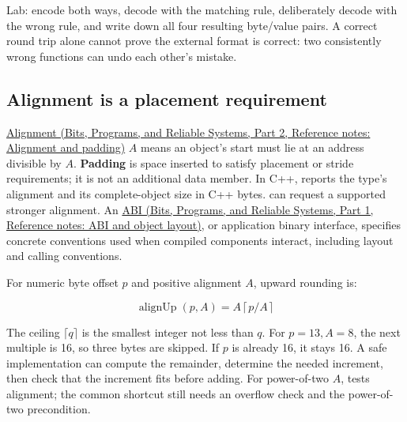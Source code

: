 Lab: encode  both ways, decode with the matching rule, deliberately decode with the wrong rule, and write down all four resulting byte/value pairs. A correct round trip alone cannot prove the external format is correct: two consistently wrong functions can undo each other's mistake.

\subsection{Alignment is a placement requirement}\label{05-engine-i-ch002-alignment-is-a-placement-requirement}

\hypertarget{05-engine-i-ch002-alignment-is-a-placement-requirement}{}

\href{../01-Bits-Programs-and-Reliable-Systems-P02/main.pdf\#nameddest=appendix-a1f7c53b4742}{Alignment (Bits, Programs, and Reliable Systems, Part 2, Reference notes: Alignment and padding)} \(A\) means an object's start must lie at an address divisible by \(A\). \textbf{Padding} is space inserted to satisfy placement or stride requirements; it is not an additional data member. In C++,  reports the type's alignment and  its complete-object size in C++ bytes.  can request a supported stronger alignment. An \href{../01-Bits-Programs-and-Reliable-Systems-P01/main.pdf\#nameddest=appendix-c4ac6bb0fff8}{ABI (Bits, Programs, and Reliable Systems, Part 1, Reference notes: ABI and object layout)}, or application binary interface, specifies concrete conventions used when compiled components interact, including layout and calling conventions.

For numeric byte offset \(p\) and positive alignment \(A\), upward rounding is:

\[
\operatorname{alignUp}(p,A)=A\left\lceil p/A\right\rceil
\]

The ceiling \(\lceil q\rceil\) is the smallest integer not less than \(q\). For \(p=13,A=8\), the next multiple is 16, so three bytes are skipped. If \(p\) is already 16, it stays 16. A safe implementation can compute the remainder, determine the needed increment, then check that the increment fits before adding. For power-of-two \(A\),  tests alignment; the common  shortcut still needs an overflow check and the power-of-two precondition.

